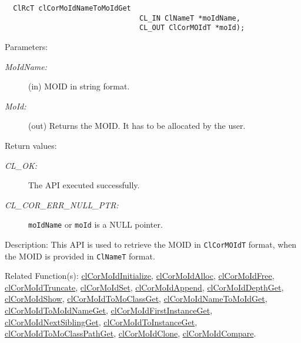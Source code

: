 \begin{flushleft}
\begin{Desc}
\footnotesize\begin{verbatim}  ClRcT clCorMoIdNameToMoIdGet
                         		CL_IN ClNameT *moIdName,
                         		CL_OUT ClCorMOIdT *moId);
\end{verbatim}
\normalsize
\end{Desc}
\begin{Desc}
\item[Parameters:]
\begin{description}
\item[{\em MoId\-Name:}](in) MOID in string format. 
\item[{\em MoId:}](out) Returns the MOID. It has to be allocated by the user.\end{description}
\end{Desc}
\begin{Desc}
\item[Return values:]
\begin{description}
\item[{\em CL\_\-OK:}]The API executed successfully.
\item[{\em CL\_\-COR\_\-ERR\_\-NULL\_\-PTR:}] {\tt{moIdName}} or {\tt{moId}} is a NULL pointer.
\end{description}
\end{Desc}
\begin{Desc}
\item[Description:]This API is used to retrieve the MOID in {\tt{ClCorMOIdT}} format, when the MOID is provided in {\tt{ClNameT}} 
format.
\end{Desc}
\begin{Desc}
\item[Related Function(s):]\hyperlink{pagecor100}{cl\-Cor\-MoId\-Initialize}, \hyperlink{pagecor113}{cl\-Cor\-MoId\-Alloc}, 
\hyperlink{pagecor114}{cl\-Cor\-MoId\-Free},
\hyperlink{pagecor115}{cl\-Cor\-MoId\-Truncate}, 
\hyperlink{pagecor116}{cl\-Cor\-MoId\-Set}, 
\hyperlink{pagecor117}{cl\-Cor\-MoId\-Append}, 
\hyperlink{pagecor118}{cl\-Cor\-MoId\-Depth\-Get}, 
\hyperlink{pagecor119}{cl\-Cor\-MoId\-Show}, 
\hyperlink{pagecor120}{cl\-Cor\-MoId\-To\-Mo\-Class\-Get}, 
\hyperlink{pagecor121}{cl\-Cor\-MoId\-Name\-To\-MoId\-Get}, 
\hyperlink{pagecor122}{cl\-Cor\-MoId\-To\-MoId\-Name\-Get}, 
\hyperlink{pagecor123}{cl\-Cor\-MoId\-First\-Instance\-Get},
\hyperlink{pagecor124}{cl\-Cor\-MoId\-Next\-Sibling\-Get}, 
\hyperlink{pagecor125}{cl\-Cor\-MoId\-To\-Instance\-Get}, 
\hyperlink{pagecor126}{cl\-Cor\-MoId\-To\-Mo\-Class\-Path\-Get}, 
\hyperlink{pagecor127}{cl\-Cor\-MoId\-Clone}, 
\hyperlink{pagecor128}{cl\-Cor\-MoId\-Compare}.\end{Desc}
\newpage



\end{flushleft}
